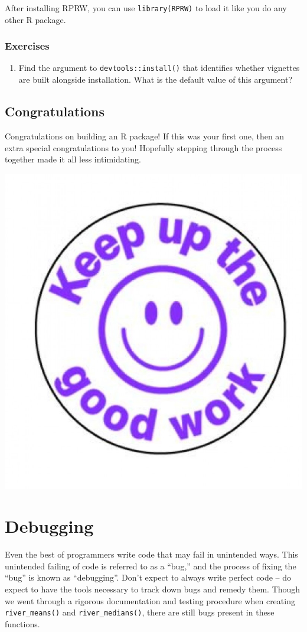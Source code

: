 \documentclass[
]{book}
\providecommand{\tightlist}{%
  \setlength{\itemsep}{0pt}\setlength{\parskip}{0pt}}
\begin{document}
After installing RPRW, you can use \texttt{library(RPRW)} to load it like you do any other R package.

\hypertarget{ex-set5}{%
\subsubsection{Exercises}\label{ex-set5}}

\begin{enumerate}
\def\labelenumi{\arabic{enumi}.}
\tightlist
\item
  Find the argument to \texttt{devtools::install()} that identifies whether vignettes are built alongside installation. What is the default value of this argument?
\end{enumerate}

\hypertarget{congratulations}{%
\subsection{Congratulations}\label{congratulations}}

Congratulations on building an R package! If this was your first one, then an extra special congratulations to you! Hopefully stepping through the process together made it all less intimidating.

\includegraphics[width=0.5\linewidth]{images/you_did_it}

\hypertarget{debugging}{%
\section{Debugging}\label{debugging}}

Even the best of programmers write code that may fail in unintended ways. This unintended failing of code is referred to as a ``bug,'' and the process of fixing the ``bug'' is known as ``debugging''. Don't expect to always write perfect code -- do expect to have the tools necessary to track down bugs and remedy them. Though we went through a rigorous documentation and testing procedure when creating \texttt{river\_means()} and \texttt{river\_medians()}, there are still bugs present in these functions.
\end{document}
